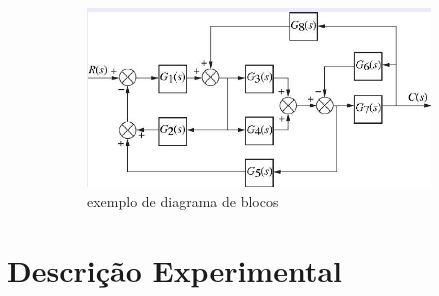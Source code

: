 \documentclass[a4paper,11pt]{article}
\begin{document}
\begin{figure}[!htp]
	\begin{subfigure}[!htp]{0.5\textwidth}
		\centering
		\includegraphics[scale = 0.5]{./images/exp2-exerc2.png}
		\caption{exemplo de diagrama de blocos}
		\label{fig:circuit2}
	\end{subfigure}		
	\caption{}
\end{figure}

\newpage
\section{Descrição Experimental}
\end{document}
